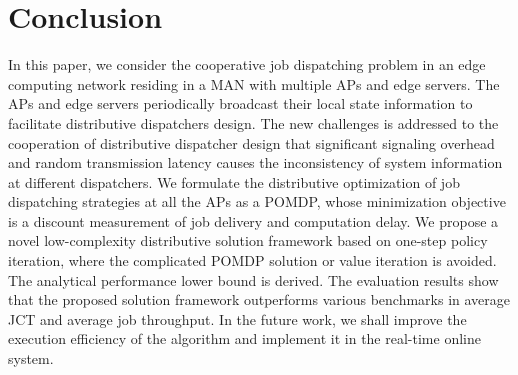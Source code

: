 \section{Conclusion}
\label{sec:conclusion}
In this paper, we consider the cooperative job dispatching problem in an edge computing network residing in a MAN with multiple APs and edge servers.
The APs and edge servers periodically broadcast their local state information to facilitate distributive dispatchers design.
The new challenges is addressed to the cooperation of distributive dispatcher design that significant signaling overhead and random transmission latency causes the inconsistency of system information at different dispatchers.
We formulate the distributive optimization of job dispatching strategies at all the APs as a POMDP, whose minimization objective is a discount measurement of job delivery and computation delay.
We propose a novel low-complexity distributive solution framework based on one-step policy iteration, where the complicated POMDP solution or value iteration is avoided.
The analytical performance lower bound is derived.
The evaluation results show that the proposed solution framework outperforms various benchmarks in average JCT and average job throughput.
In the future work, we shall improve the execution efficiency of the algorithm and implement it in the real-time online system. 